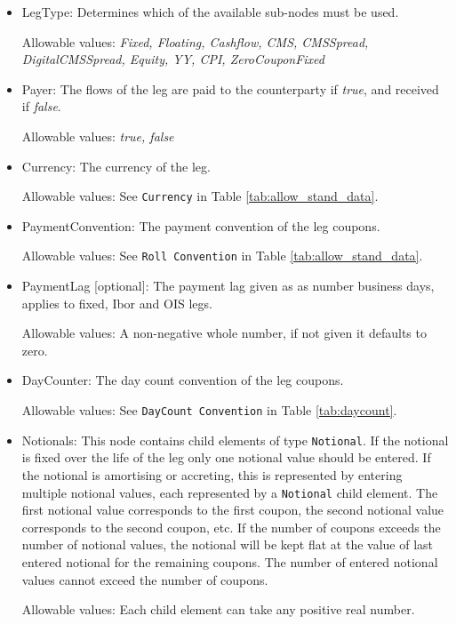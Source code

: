 \begin{itemize}
\item LegType:  Determines which of the available sub-nodes must be
  used. 

Allowable values:  \emph{Fixed, Floating, Cashflow, CMS, CMSSpread, DigitalCMSSpread, Equity, YY, CPI, ZeroCouponFixed}

\item Payer:  The flows of the leg are paid to the counterparty if
  \emph{true}, and received if \emph{false}.  

Allowable values:  \emph{true, false} 

\item Currency: The currency of the leg. 

Allowable values:  See \lstinline!Currency! in Table \ref{tab:allow_stand_data}.

\item PaymentConvention: The payment convention of the leg coupons. 

Allowable values: See \lstinline!Roll Convention! in Table \ref{tab:allow_stand_data}.

\item PaymentLag [optional]: The payment lag given as as number business days, applies to fixed, Ibor and OIS legs.

Allowable values: A non-negative whole number, if not given it defaults to zero.

\item DayCounter: The day count convention of the leg coupons. 

Allowable values: See \lstinline!DayCount Convention! in Table \ref{tab:daycount}.

\item Notionals: This node contains child elements of type
  \lstinline!Notional!. If the notional is fixed over the life of the
  leg only one notional value should be entered. If the notional is
  amortising or accreting, this is represented by entering multiple
  notional values, each represented by a \lstinline!Notional! child
  element. The first notional value corresponds to the first coupon,
  the second notional value corresponds to the second coupon, etc. If
  the number of coupons exceeds the number of notional values, the
  notional will be kept flat at the value of last entered notional for
  the remaining coupons.  The number of entered notional values cannot
  exceed the number of coupons.

Allowable values: Each child element can take any positive real number.


\end{itemize}
